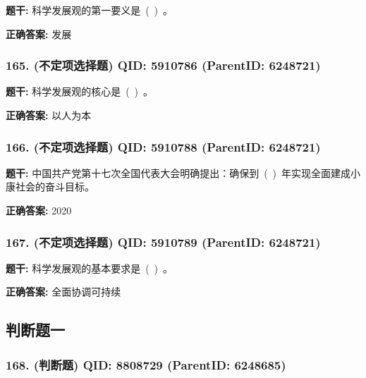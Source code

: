 \documentclass[12pt,UTF8]{ctexart}
\begin{document}
\textbf{题干:}
科学发展观的第一要义是 ( ) 。



\textbf{正确答案:}
发展

\vspace{0.3em}\hrulefill\vspace{0.7em}

\subsubsection*{165. (不定项选择题) \small QID: 5910786 (ParentID: 6248721)}

\textbf{题干:}
科学发展观的核心是 ( ) 。



\textbf{正确答案:}
以人为本

\vspace{0.3em}\hrulefill\vspace{0.7em}

\subsubsection*{166. (不定项选择题) \small QID: 5910788 (ParentID: 6248721)}

\textbf{题干:}
中国共产党第十七次全国代表大会明确提出：确保到 ( ) 年实现全面建成小康社会的奋斗目标。



\textbf{正确答案:}
2020

\vspace{0.3em}\hrulefill\vspace{0.7em}

\subsubsection*{167. (不定项选择题) \small QID: 5910789 (ParentID: 6248721)}

\textbf{题干:}
科学发展观的基本要求是 ( ) 。



\textbf{正确答案:}
全面协调可持续

\vspace{0.3em}\hrulefill\vspace{0.7em}

\subsection*{判断题一}

\subsubsection*{168. (判断题) \small QID: 8808729 (ParentID: 6248685)}
\end{document}
